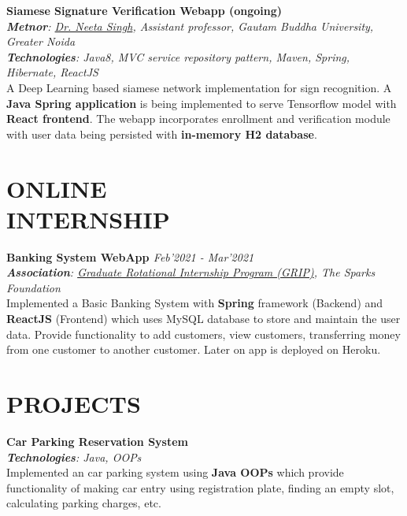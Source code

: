 \documentclass[resmargin]{res}
\begin{document}
\begin{resume}
\textbf{Siamese Signature Verification Webapp (ongoing)} {\sl  \hfill}
\\{\sl \textbf{Metnor}: \href{https://sites.google.com/view/neetasingh112}{Dr. Neeta Singh}, Assistant professor, Gautam Buddha University, Greater Noida}
\\{\sl \textbf{Technologies}: Java8, MVC service repository pattern, Maven, Spring, Hibernate, ReactJS}
\\ A Deep Learning  based siamese network implementation for sign recognition. A \textbf{Java Spring application} is being implemented to serve Tensorflow model with \textbf{React frontend}. The webapp incorporates enrollment and verification module with user data being persisted with \textbf{in-memory H2 database}.

\section{ONLINE\\ INTERNSHIP}

\textbf{Banking System WebApp
\href{https://www.youtube.com/watch?v=uO6ZealjeIA}{}
\href{https://bank-management-service-app.herokuapp.com/}{}
\href{https://github.com/malavp1998/bank-management-service}{\faGitSquare} \href{https://github.com/malavp1998/bank-management-web}{\faGitSquare}} {\sl  \hfill Feb'2021 - Mar'2021}
\\{\sl \textbf{Association}: \href{https://www.thesparksfoundationsingapore.org/join-us/internship-positions/}{Graduate Rotational Internship Program (GRIP)}, The Sparks Foundation}
\\Implemented a Basic Banking System with \textbf{Spring} framework (Backend) and \textbf{ReactJS} (Frontend) which uses MySQL database to store and maintain the user data.
Provide functionality to add customers, view customers, transferring money from one customer to another customer. Later on app is deployed on Heroku.

\section{PROJECTS}

\textbf{Car Parking Reservation System \href{https://github.com/malavp1998/parking-lot}{\faGitSquare}
}{\sl\hfill}
\\{\sl \textbf{Technologies}: Java, OOPs}
\\ Implemented an car parking system using \textbf{Java OOPs} which provide functionality of making car entry using registration plate, finding an empty slot, calculating parking charges, etc. 


\end{resume}
\end{document}
